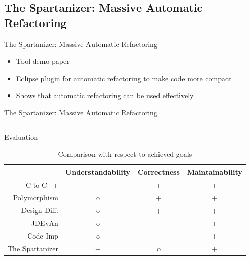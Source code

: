\documentclass{beamer}
\begin{document}
\subsection{The Spartanizer: Massive Automatic Refactoring}

\begin{frame}{The Spartanizer: Massive Automatic Refactoring}
  \begin{itemize}
    \item Tool demo paper
    \item Eclipse plugin for automatic refactoring to make code more compact
    \pause
    \item Shows that automatic refactoring can be used effectively
  \end{itemize}
\end{frame}

\begin{frame}[fragile]{The Spartanizer: Massive Automatic Refactoring}
  \begin{columns}[T]
    \begin{column}{.49\textwidth}
      
    \end{column}
    \begin{column}{.5\textwidth}
      
    \end{column}
  \end{columns}
\end{frame}

\begin{frame}{Evaluation} 
  \begin{table}[htb]
    \centering
    \caption{Comparison with respect to achieved goals}
    \label{tbl:goals}
    \begin{tabular}{r|ccc}
      ~               & Understandability & Correctness & Maintainability \\ \hline
      C to C++        & +                 & +           & + \\
      Polymorphism    & o                 & +           & + \\
      Design Diff.    & o                 & +           & + \\
      JDEvAn          & o                 & -           & + \\
      Code-Imp        & o                 & -           & + \\
      The Spartanizer & +                 & o           & + \\
    \end{tabular}
  \end{table}
\end{frame}
\end{document}
